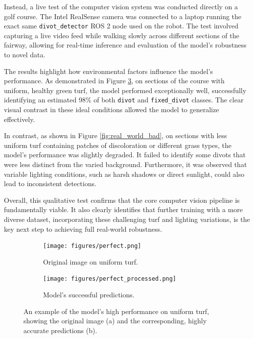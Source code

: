 Instead, a live test of the computer vision system was conducted directly on a golf course. The Intel RealSense camera was connected to a laptop running the exact same \texttt{divot\_detector} ROS 2 node used on the robot. The test involved capturing a live video feed while walking slowly across different sections of the fairway, allowing for real-time inference and evaluation of the model's robustness to novel data.

The results highlight how environmental factors influence the model's performance. As demonstrated in Figure \ref{fig:real_world_good}, on sections of the course with uniform, healthy green turf, the model performed exceptionally well, successfully identifying an estimated 98\% of both \texttt{divot} and \texttt{fixed\_divot} classes. The clear visual contrast in these ideal conditions allowed the model to generalize effectively.

In contrast, as shown in Figure \ref{fig:real_world_bad}, on sections with less uniform turf containing patches of discoloration or different grass types, the model's performance was slightly degraded. It failed to identify some divots that were less distinct from the varied background. Furthermore, it was observed that variable lighting conditions, such as harsh shadows or direct sunlight, could also lead to inconsistent detections.

Overall, this qualitative test confirms that the core computer vision pipeline is fundamentally viable. It also clearly identifies that further training with a more diverse dataset, incorporating these challenging turf and lighting variations, is the key next step to achieving full real-world robustness.

\begin{figure}[h!]
    \centering
    \begin{subfigure}[b]{0.49\textwidth}
        \centering
        \texttt{[image: figures/perfect.png]} 
        \caption{Original image on uniform turf.}
        \label{fig:good_original}
    \end{subfigure}
    \hfill %
    \begin{subfigure}[b]{0.49\textwidth}
        \centering
        \texttt{[image: figures/perfect\_processed.png]} 
        \caption{Model's successful predictions.}
        \label{fig:good_prediction}
    \end{subfigure}
    \caption[High-performance example of divot detection.]
    {An example of the model's high performance on uniform turf, showing the original image (a) and the corresponding, highly accurate predictions (b).}
    \label{fig:real_world_good}

\end{figure}

